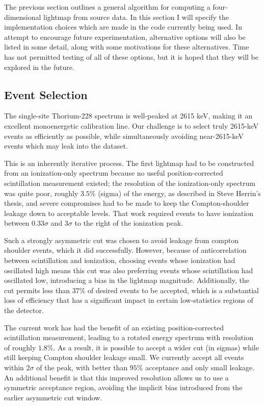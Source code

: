 The previous section outlines a general algorithm for computing a four-dimensional lightmap from source data.  In this section I will specify the implementation choices which are made in the code currently being used.  In attempt to encourage future experimentation, alternative options will also be listed in some detail, along with some motivations for these alternatives.  Time has not permitted testing of all of these options, but it is hoped that they will be explored in the future.

\subsection{Event Selection}

The single-site Thorium-228 spectrum is well-peaked at 2615 keV, making it an excellent monoenergetic calibration line.  Our challenge is to select truly 2615-keV events as efficiently as possible, while simultaneously avoiding near-2615-keV events which may leak into the dataset.

This is an inherently iterative process.  The first lightmap had to be constructed from an ionization-only spectrum because no useful position-corrected scintillation measurement existed; the resolution of the ionization-only spectrum was quite poor, roughly $3.5\%$ (sigma) of the energy, as described in Steve Herrin's thesis, and severe compromises had to be made to keep the Compton-shoulder leakage down to acceptable levels.  That work required events to have ionization between $0.33\sigma$ and $3\sigma$ to the right of the ionization peak.~\cite{ThesisSteve}

Such a strongly asymmetric cut was chosen to avoid leakage from compton shoulder events, which it did successfully.  However, because of anticorrelation between scintillation and ionization, choosing events whose ionization had oscillated high means this cut was also preferring events whose scintillation had oscillated low, introducing a bias in the lightmap magnitude.  Additionally, the cut permits less than $37\%$ of desired events to be accepted, which is a substantial loss of efficiency that has a significant impact in certain low-statistics regions of the detector.

The current work has had the benefit of an existing position-corrected scintillation measurement, leading to a rotated energy spectrum with resolution of roughly $1.8\%$.  As a result, it is possible to accept a wider cut (in sigmas) while still keeping Compton shoulder leakage small.  We currently accept all events within $2\sigma$ of the peak, with better than $95\%$ acceptance and only small leakage.  An additional benefit is that this improved resolution allows us to use a symmetric acceptance region, avoiding the implicit bias introduced from the earlier asymmetric cut window.

